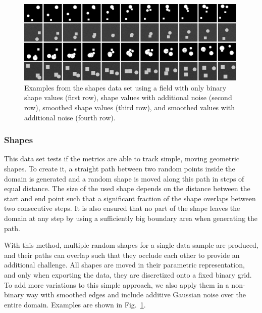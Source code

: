 \begin{figure}[bp]
    \centering
    \includegraphics[width=0.99\textwidth]{ImagesDatasets/ShapesDefault_small}
    \caption{Examples from the shapes data set using a field with only binary shape values (first row), shape values with additional noise (second row), smoothed shape values (third row), and smoothed values with additional noise (fourth row).}
    \label{fig: shapes example}
    \vfill
\end{figure}

\subsubsection*{Shapes}
This data set tests if the metrics are able to track simple, moving geometric shapes. To create it, a straight path between two random points inside the domain is generated and a random shape is moved along this path in steps of equal distance. The size of the used shape depends on the distance between the start and end point such that a significant fraction of the shape overlaps between two consecutive steps. It is also ensured that no part of the shape leaves the domain at any step by using a sufficiently big boundary area when generating the path.

With this method, multiple random shapes for a single data sample are produced, and their paths can overlap such that they occlude each other to provide an additional challenge. All shapes are moved in their parametric representation, and only when exporting the data, they are discretized onto a fixed binary grid. To add more variations to this simple approach, we also apply them in a non-binary way with smoothed edges and include additive Gaussian noise over the entire domain. Examples are shown in Fig.~\ref{fig: shapes example}.


